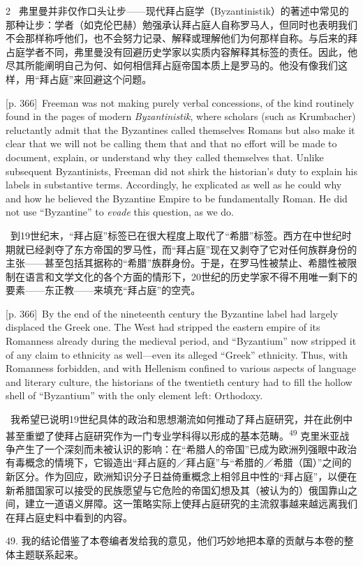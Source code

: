 \documentclass[10pt,a4paper]{article}
\begin{document}
\begin{paracol}{2}
\switchcolumn*
{\scriptsize\color{gray}[p. 366]}\ 弗里曼并非仅作口头让步——现代拜占庭学（Byzantinistik）的著述中常见的那种让步：学者（如克伦巴赫）勉强承认拜占庭人自称罗马人，但同时也表明我们不会那样称呼他们，也不会努力记录、解释或理解他们为何那样自称。与后来的拜占庭学者不同，弗里曼没有回避历史学家以实质内容解释其标签的责任。因此，他尽其所能阐明自己为何、如何相信拜占庭帝国本质上是罗马的。他没有像我们这样，用“拜占庭”来回避这个问题。\par
\switchcolumn
{\scriptsize\color{gray}[p. 366]}\ Freeman was not making purely verbal concessions, of the kind routinely found in the pages of modern \textit{Byzantinistik}, where scholars (such as Krumbacher) reluctantly admit that the Byzantines called themselves Romans but also make it clear that we will not be calling them that and that no effort will be made to document, explain, or understand why they called themselves that. Unlike subsequent Byzantinists, Freeman did not shirk the historian’s duty to explain his labels in substantive terms. Accordingly, he explicated as well as he could why and how he believed the Byzantine Empire to be fundamentally Roman. He did not use “Byzantine” to \textit{evade} this question, as we do.\par
\switchcolumn*
{\scriptsize\color{gray}[p. 366]}\ 到19世纪末，“拜占庭”标签已在很大程度上取代了“希腊”标签。西方在中世纪时期就已经剥夺了东方帝国的罗马性，而“拜占庭”现在又剥夺了它对任何族群身份的主张——甚至包括其据称的“希腊”族群身份。于是，在罗马性被禁止、希腊性被限制在语言和文学文化的各个方面的情形下，20世纪的历史学家不得不用唯一剩下的要素——东正教——来填充“拜占庭”的空壳。\par
\switchcolumn
{\scriptsize\color{gray}[p. 366]}\ By the end of the nineteenth century the Byzantine label had largely displaced the Greek one. The West had stripped the eastern empire of its Romanness already during the medieval period, and “Byzantium” now stripped it of any claim to ethnicity as well—even its alleged “Greek” ethnicity. Thus, with Romanness forbidden, and with Hellenism confined to various aspects of language and literary culture, the historians of the twentieth century had to fill the hollow shell of “Byzantium” with the only element left: Orthodoxy.\par
\switchcolumn*
{\scriptsize\color{gray}[p. 366–367]}\ 我希望已说明19世纪具体的政治和思想潮流如何推动了拜占庭研究，并在此例中甚至重塑了使拜占庭研究作为一门专业学科得以形成的基本范畴。\nobreak\textsuperscript{49} 克里米亚战争产生了一个深刻而未被认识的影响：在“希腊人的帝国”已成为欧洲列强眼中政治有毒概念的情境下，它锻造出“拜占庭的／拜占庭”与“希腊的／希腊（国）”之间的新区分。作为回应，欧洲知识分子日益倚重概念上相邻且中性的“拜占庭”，以便在新希腊国家可以接受的民族愿望与它危险的帝国幻想及其（被认为的）俄国靠山之间，建立一道语义屏障。这一策略实际上使拜占庭研究的主流叙事越来越远离我们在拜占庭史料中看到的内容。\par{\small 49. 我的结论借鉴了本卷编者发给我的意见，他们巧妙地把本章的贡献与本卷的整体主题联系起来。\par}

\end{paracol}
\end{document}
